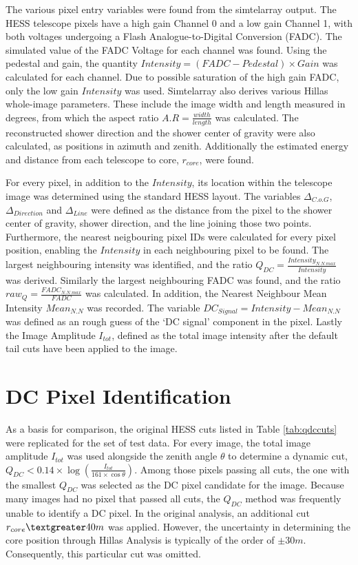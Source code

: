 \documentclass[]{article}
\begin{document}
The various pixel entry variables were found from the sim\textunderscore telarray output. The HESS telescope pixels have a high gain Channel 0 and a low gain Channel 1, with both voltages undergoing a Flash Analogue-to-Digital Conversion (FADC). The simulated value of the FADC Voltage for each channel was found. Using the pedestal and gain, the quantity $Intensity = (FADC - Pedestal)\times Gain $ was calculated for each channel. Due to possible saturation of the high gain FADC, only the low gain $Intensity$ was used. Sim\textunderscore telarray also derives various Hillas whole-image parameters. These include the image width and length measured in degrees, from which the aspect ratio $A.R = \frac{width}{length}$ was calculated. The reconstructed shower direction and the shower center of gravity were also calculated, as positions in azimuth and zenith. Additionally the estimated energy and distance from each telescope to core, $r_{core}$,  were found.

For every pixel, in addition to the $Intensity$, its location within the telescope image was determined using the standard HESS layout. The variables $ \Delta_{C.o.G}$, $\Delta_{Direction}$ and $\Delta_{Line}$ were defined as the distance from the pixel to the shower center of gravity, shower direction, and the line joining those two points. Furthermore, the nearest neigbouring pixel IDs were calculated for every pixel position, enabling the $Intensity$ in each neighbouring pixel to be found. The largest neighbouring intensity was identified, and the ratio $Q_{DC} = \frac{Intensity_{N.N.max}}{Intensity}$ was derived. Similarly the largest neighbouring FADC was found, and the ratio $raw_{Q} = \frac{FADC_{N.N.max}}{FADC}$ was calculated. In addition, the Nearest Neighbour Mean Intensity $Mean_{N.N}$ was recorded. The variable $DC_{Signal} = Intensity-Mean_{N.N}$ was defined as an rough guess of the \textquoteleft DC signal' component in the pixel. Lastly the Image Amplitude $I_{tot}$, defined as the total image intensity after the default tail cuts have been applied to the image.

\section{DC Pixel Identification}  
As a basis for comparison, the original HESS cuts listed in Table \ref{tab:qdccuts} were replicated for the set of test data. For every image, the total image amplitude $I_{tot}$ was used alongside the zenith angle $\theta$ to determine a dynamic cut, $Q_{DC} < 0.14 \times \log(\frac{I_{tot}}{161 \times \cos \theta})$. Among those pixels passing all cuts, the one with the smallest $Q_{DC}$ was selected as the DC pixel candidate for the image. Because many images had no pixel that passed all cuts, the $Q_{DC}$ method was frequently unable to identify a DC pixel. In the original analysis, an additional cut $r_{core} \textgreater 40m$ was applied. However, the uncertainty in determining the core position through Hillas Analysis is typically of the order of $\pm 30m$. Consequently, this particular cut was omitted.
\end{document}
